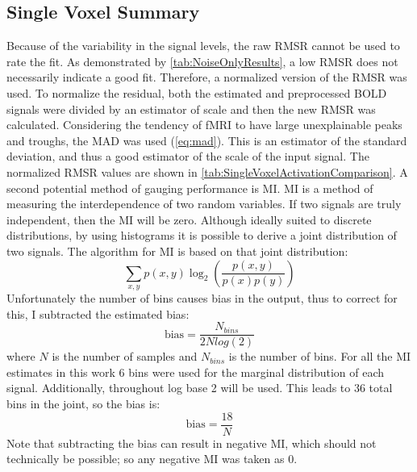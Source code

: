 \subsection{Single Voxel Summary}
\label{sec:SingleVoxelReview}
Because of the variability in the signal levels, the
raw \ac{RMSR} cannot be used to rate the fit. As demonstrated by \autoref{tab:NoiseOnlyResults},
a low \ac{RMSR} does not necessarily indicate a good fit.
Therefore, a normalized version of the \ac{RMSR} was used. To normalize the
residual, both the estimated and preprocessed \ac{BOLD} signals were divided by an estimator
of scale and then the new \ac{RMSR} was calculated.
Considering the tendency of \ac{fMRI} to have large unexplainable
peaks and troughs, the \ac{MAD} was used (\autoref{eq:mad}).
This is an estimator of the standard
deviation, and thus a good estimator of the scale of the input signal.
The normalized \ac{RMSR} values are
shown in \autoref{tab:SingleVoxelActivationComparison}. A second potential method of
gauging performance is \ac{MI}. \acl{MI} is a method of measuring
the interdependence of two random variables. If two signals are truly independent,
then the \ac{MI} will be zero. Although ideally suited to discrete
distributions, by using histograms
it is possible to derive a joint distribution of two signals. The algorithm for
\ac{MI} is based on that joint distribution:
\begin{equation}
\sum_{x,y} p(x,y) \log_2\left(\frac{p(x,y)}{p(x)p(y)}\right)
\end{equation}
Unfortunately the number of bins causes bias in the output, thus to correct for this,
I subtracted the estimated bias:
\begin{equation}
\text{bias} = \frac{N_{bins}}{2Nlog(2)}
\end{equation}
where $N$ is the number of samples and $N_{bins}$ is the number of bins. For all
the \ac{MI} estimates in this work 6 bins were used for the marginal
distribution of each signal. Additionally, throughout log base 2 will be used.
This leads to 36 total bins in the joint, so the bias is:
\begin{equation}
\text{bias} = \frac{18}{N}
\end{equation}
 Note that subtracting the bias can result in negative 
\ac{MI}, which should not technically be possible; so any negative \acl{MI}
was taken as 0.

